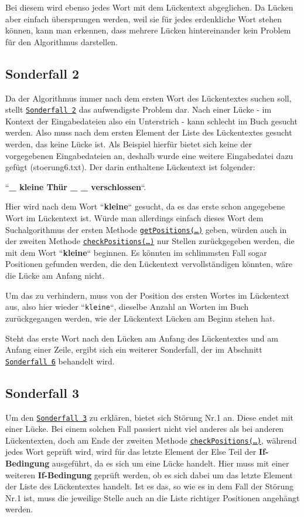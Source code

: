 \documentclass[a4paper, 10pt, ngerman]{scrartcl}
\begin{document}
Bei diesem wird ebenso jedes Wort mit dem Lückentext abgeglichen.
Da Lücken aber einfach übersprungen werden,
weil sie für jedes erdenkliche Wort stehen können,
kann man erkennen,
dass mehrere Lücken hintereinander kein Problem für den Algorithmus darstellen.

\subsection{Sonderfall 2}\label{sec:zweiterSonderfall}
Da der Algorithmus immer nach dem ersten Wort des Lückentextes suchen soll,
stellt \hyperref[sonderfallZwei]{\texttt{Sonderfall 2}} das aufwendigste Problem dar.
Nach einer Lücke
- im Kontext der Eingabedateien also ein Unterstrich -
kann schlecht im Buch gesucht werden.
Also muss nach dem ersten Element der Liste des Lückentextes gesucht werden,
das keine Lücke ist.
Als Beispiel hierfür bietet sich keine der vorgegebenen Eingabedateien an,
deshalb wurde eine weitere Eingabedatei dazu gefügt
(stoerung6.txt).
Der darin enthaltene Lückentext ist folgender:

``\textbf{\_ kleine Thür \_ \_ verschlossen}``.

Hier wird nach dem Wort ``\textbf{kleine}`` gesucht,
da es das erste schon angegebene Wort im Lückentext ist.
Würde man allerdings einfach dieses Wort dem Suchalgorithmus der ersten Methode \hyperref[sec:getPositions()]{\texttt{getPositions(\ldots)}} geben,
würden auch in der zweiten Methode \hyperref[sec:checkPositions()]{\texttt{checkPositions(\ldots)}} nur Stellen zurückgegeben werden,
die mit dem Wort ``\textbf{kleine}`` beginnen.
Es könnten im schlimmsten Fall sogar Positionen gefunden werden,
die den Lückentext vervollständigen könnten,
wäre die Lücke am Anfang nicht.

Um das zu verhindern,
muss von der Position des ersten Wortes im Lückentext aus,
also hier wieder ``\texttt{kleine}``,
dieselbe Anzahl an Worten im Buch zurückgegangen werden,
wie der Lückentext Lücken am Beginn stehen hat.

Steht das erste Wort nach den Lücken am Anfang des Lückentextes und am Anfang einer Zeile,
ergibt sich ein weiterer Sonderfall,
der im Abschnitt \hyperref[sec:sechsterSonderfall]{\texttt{Sonderfall 6}} behandelt wird.

\subsection{Sonderfall 3}\label{sec:dritterSonderfall}
Um den \hyperref[sonderfallDrei]{\texttt{Sonderfall 3}} zu erklären,
bietet sich Störung Nr.1 an.
Diese endet mit einer Lücke.
Bei einem solchen Fall passiert nicht viel anderes als bei anderen Lückentexten,
doch am Ende der zweiten Methode \hyperref[sec:checkPositions()]{\texttt{checkPositions(\ldots)}},
während jedes Wort geprüft wird,
wird für das letzte Element der Else Teil der \textbf{If-Bedingung} ausgeführt,
da es sich um eine Lücke handelt.
Hier muss mit einer weiteren \textbf{If-Bedingung} geprüft werden,
ob es sich dabei um das letzte Element der Liste des Lückentextes handelt.
Ist es das,
so wie es in dem Fall der Störung Nr.1 ist,
muss die jeweilige Stelle auch an die Liste richtiger Positionen angehängt werden.
\end{document}
